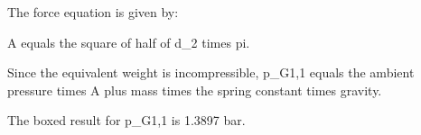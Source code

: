 The force equation is given by:

A equals the square of half of d_2 times pi.

Since the equivalent weight is incompressible, p_G1,1 equals the ambient pressure times A plus mass times the spring constant times gravity.

The boxed result for p_G1,1 is 1.3897 bar.